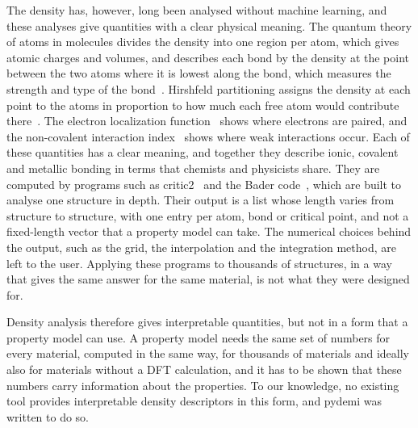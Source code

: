 \documentclass[journal=jctcce,manuscript=article,email=true]{achemso}
\newcommand{\rev}[1]{{\color{blue}#1}}
\begin{document}
The density has, however, long been analysed without machine learning, and
these analyses give quantities with a clear physical meaning. The quantum theory
of atoms in molecules divides the density into one region per atom, which gives
atomic charges and volumes, and describes each bond by the density at the point
between the two atoms where it is lowest along the bond, which measures the
strength and type of the bond~\cite{bader1990}. Hirshfeld partitioning assigns
the density at each point to the atoms in proportion to how much each free atom
would contribute there~\cite{hirshfeld1977}.
The electron localization function~\cite{becke1990} shows where electrons are
paired, and the non-covalent interaction index~\cite{johnson2010} shows where
weak interactions occur. Each of these quantities has a clear meaning, and
together they describe ionic, covalent and metallic bonding in terms that
chemists and physicists share. They are computed by programs such as
critic2~\cite{oterodelaroza2014} and the Bader code~\cite{henkelman2006}, which
are built to analyse one structure in depth. Their output is a list whose length
varies from structure to structure, with one entry per atom, bond or critical
point, and not a fixed-length vector that a property model can take. The
numerical choices behind the output, such as the grid, the interpolation and the
integration method, are left to the user. Applying these programs to thousands
of structures, in a way that gives the same answer for the same material, is
not what they were designed for.

Density analysis therefore gives interpretable quantities, but not in a form
that a property model can use. A property model needs the same set of numbers
for every material, computed in the same way, for thousands of materials and
ideally also for materials without a DFT calculation, and it has to be shown
that these numbers carry information about the properties. To our knowledge, no
existing tool provides \rev{interpretable density descriptors in this form}, and pydemi was written to do so.
\end{document}
